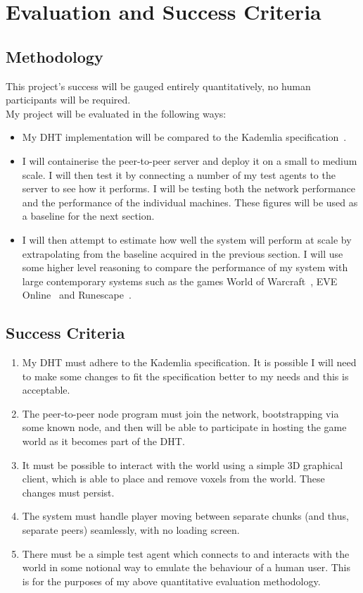 \documentclass[12pt,a4paper]{article}
\begin{document}
	\section{Evaluation and Success Criteria}
	
	\subsection{Methodology}
	
	This project's success will be gauged entirely quantitatively, no human participants will be required.\\
	My project will be evaluated in the following ways:
	\begin{itemize}
		\item My DHT implementation will be compared to the Kademlia specification~\cite{kademlia}.
		\item I will containerise the peer-to-peer server and deploy it on a small to medium scale. I will then test it by connecting a number of my test agents to the server to see how it performs. I will be testing both the network performance and the performance of the individual machines. These figures will be used as a baseline for the next section.
		\item I will then attempt to estimate how well the system will perform at scale by extrapolating from the baseline acquired in the previous section. I will use some higher level reasoning to compare the performance of my system with large contemporary systems such as the games World of Warcraft~\cite{wow}, EVE Online~\cite{eve} and Runescape~\cite{rune}.
	\end{itemize}

	\subsection{Success Criteria}
	
	\begin{enumerate}
		\item My DHT must adhere to the Kademlia specification. It is possible I will need to make some changes to fit the specification better to my needs and this is acceptable.
		\item The peer-to-peer node program must join the network, bootstrapping via some known node, and then will be able to participate in hosting the game world as it becomes part of the DHT.
		\item It must be possible to interact with the world using a simple 3D graphical client, which is able to place and remove voxels from the world. These changes must persist.
		\item The system must handle player moving between separate chunks (and thus, separate peers) seamlessly, with no loading screen.
		\item There must be a simple test agent which connects to and interacts with the world in some notional way to emulate the behaviour of a human user. This is for the purposes of my above quantitative evaluation methodology.
	\end{enumerate}
	
\end{document}
